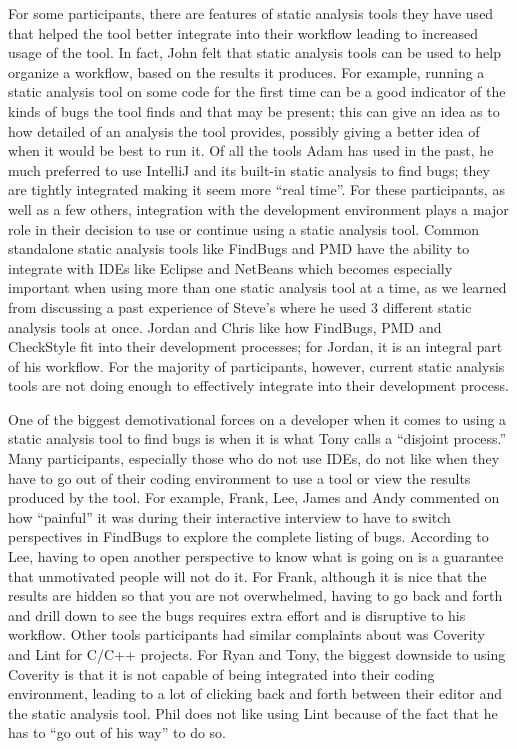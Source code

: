 For some participants, there are features of static analysis tools they
have used that helped the tool better integrate into their workflow leading to
increased usage of the tool. In fact, John felt that
static analysis tools can be used to help organize a workflow, based on the
results it produces. For example, running a static analysis tool on
some code for the first time can be a good indicator of the kinds of bugs
the tool finds and that may be present; this can give an idea as to how detailed
of an analysis the tool provides, possibly giving a better idea of when it
would be best to run it. Of all the tools Adam has used in the past, he
much preferred to use IntelliJ and its built-in static analysis to find bugs; they
are tightly integrated making it seem more ``real time''. For these
participants, as well as a few others, integration with the development
environment plays a major role in their decision to use or continue using a
static analysis tool. Common standalone static analysis tools like FindBugs and
PMD have the ability to integrate with IDEs like Eclipse and NetBeans which
becomes especially important when using more than one static analysis
tool at a time, as we learned from discussing a past experience of Steve's where
he used 3 different static analysis tools at once. Jordan and
Chris like how FindBugs, PMD and CheckStyle fit into their
development processes; for Jordan, it is an integral part of his workflow. For the
majority of participants, however, current static analysis tools are not
doing enough to effectively integrate into their development process.

One of the biggest demotivational forces on a developer when it comes to using a
static analysis tool to find bugs is when it is what Tony calls a ``disjoint
process.'' Many participants, especially those who do not use IDEs, do
not like when they have to go out of their coding environment to use a tool or
view the results produced by the tool. For example, Frank, Lee, James and Andy
commented on how ``painful'' it was during their interactive interview to have
to switch perspectives in FindBugs to explore the complete
listing of bugs. According to Lee, having to open another perspective to know
what is going on is a guarantee that unmotivated people will not do it. For
Frank, although it is nice that the results are hidden so that you are not
overwhelmed, having to go back and forth and drill down to see the bugs requires
extra effort and is disruptive to his workflow. Other tools participants had
similar complaints about was Coverity and Lint for C/C++ projects. For Ryan and
Tony, the biggest downside to using Coverity is that it is not capable of being
integrated into their coding environment, leading to a lot of clicking back and
forth between their editor and the static analysis tool. Phil does not like
using Lint because of the fact that he has to ``go out of his way'' to do so.

